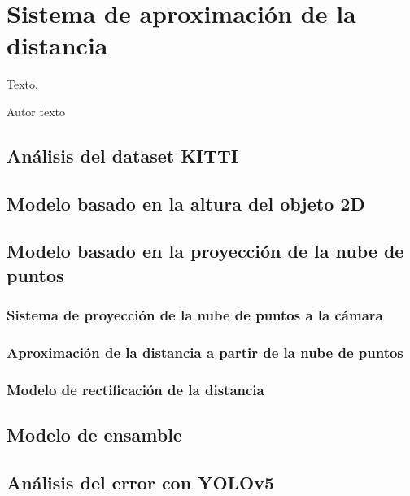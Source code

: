 \chapter{Sistema de aproximación de la distancia}
\label{cha:Sistema de aproximación de la distancia}

\begin{FraseCelebre}
  \begin{Frase}
    Texto.
  \end{Frase}
  \begin{Fuente}
    Autor texto
  \end{Fuente}
\end{FraseCelebre}

\section{Análisis del dataset KITTI}
\label{sec:Análisis del dataset KITTI}

\section{Modelo basado en la altura del objeto 2D}
\label{sec:Modelo basado en la altura del objeto 2D}

\section{Modelo basado en la proyección de la nube de puntos}
\label{sec:Modelo basado en la proyección de la nube de puntos}

\subsection{Sistema de proyección de la nube de puntos a la cámara}
\label{sec:Sistema de proyección de la nube de puntos a la cámara}

\subsection{Aproximación de la distancia a partir de la nube de puntos}
\label{sec:Aproximación de la distancia a partir de la nube de puntos}

\subsection{Modelo de rectificación de la distancia}
\label{sec:Modelo de rectificación de la distancia}

\section{Modelo de ensamble}
\label{sec:Modelo de ensamble}

\section{Análisis del error con YOLOv5}
\label{sec:Análisis del error con YOLOv5}
